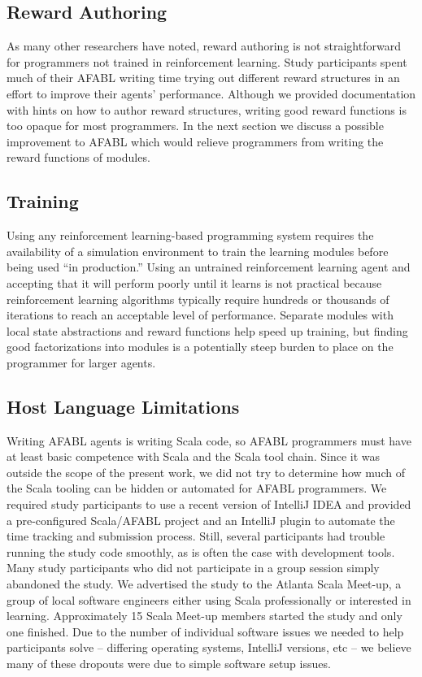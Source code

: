 
\subsection{Reward Authoring}

As many other researchers have noted, reward authoring is not straightforward for programmers not trained in reinforcement learning. Study participants spent much of their AFABL writing time trying out different reward structures in an effort to improve their agents' performance. Although we provided documentation with hints on how to author reward structures, writing good reward functions is too opaque for most programmers. In the next section we discuss a possible improvement to AFABL which would relieve programmers from writing the reward functions of modules.

\subsection{Training}

Using any reinforcement learning-based programming system requires the availability of a simulation environment to train the learning modules before being used ``in production.'' Using an untrained reinforcement learning agent and accepting that it will perform poorly until it learns is not practical because reinforcement learning algorithms typically require hundreds or thousands of iterations to reach an acceptable level of performance. Separate modules with local state abstractions and reward functions help speed up training, but finding good factorizations into modules is a potentially steep burden to place on the programmer for larger agents.

\subsection{Host Language Limitations}

Writing AFABL agents is writing Scala code, so AFABL programmers must have at least basic competence with Scala and the Scala tool chain. Since it was outside the scope of the present work, we did not try to determine how much of the Scala tooling can be hidden or automated for AFABL programmers. We required study participants to use a recent version of IntelliJ IDEA and provided a pre-configured Scala/AFABL project and an IntelliJ plugin to automate the time tracking and submission process. Still, several participants had trouble running the study code smoothly, as is often the case with development tools. Many study participants who did not participate in a group session simply abandoned the study. We advertised the study to the Atlanta Scala Meet-up, a group of local software engineers either using Scala professionally or interested in learning. Approximately 15 Scala Meet-up members started the study and only one finished. Due to the number of individual software issues we needed to help participants solve -- differing operating systems, IntelliJ versions, etc -- we believe many of these dropouts were due to simple software setup issues.

